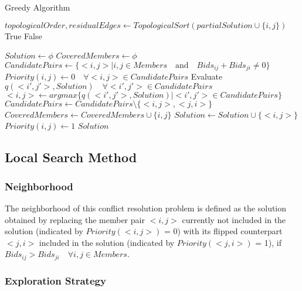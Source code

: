 \documentclass{article}
\begin{document}
\begin{algorithm}[H]
\renewcommand{\thealgorithm}{}
\caption{Greedy Algorithm}
\begin{algorithmic}

\State $topologicalOrder, residualEdges \gets TopologicalSort(partialSolution \cup \{{i,j}\})$
\State \Return True
\Else
\State \Return False
\EndIf
\EndFunction

\Statex

\State $Solution \gets \phi$
\State $CoveredMembers \gets \phi$
\State $CandidatePairs \gets \{<i,j> \mid i,j \in Members \quad \textrm{and} \quad Bids_{ij} + Bids_{ji} \neq 0\}$
\State $Priority(i,j) \gets 0 \quad \forall <i,j> \in CandidatePairs$
    \State Evaluate $q(<i',j'>, Solution) \quad \forall <i',j'> \in CandidatePairs$
    \State $<i,j> \gets argmax\{q(<i', j'>, Solution)\lvert <i', j'> \in CandidatePairs \}$
    \State $CandidatePairs \gets CandidatePairs \setminus \{<i,j>, <j,i>\}$
    \State $CoveredMembers \gets CoveredMembers \cup \{i,j\}$
    \State $Solution \gets Solution \cup \{<i,j>\}$
    \State $Priority(i,j) \gets 1$
\EndWhile
\State \Return $Solution$

\end{algorithmic}
\end{algorithm}

\subsection{Local Search Method}

\subsubsection{Neighborhood}

The neighborhood of this conflict resolution problem is defined as the solution obtained by replacing the member pair $<i,j>$ currently not included in the solution (indicated by $Priority(<i,j>)$ = 0) with its flipped counterpart $<j,i>$ included in the solution (indicated by $Priority(<j,i>)$ = 1), if $Bids_{ij} > Bids_{ji} \quad \forall i,j \in Members$.

\subsubsection{Exploration Strategy}
\end{document}
